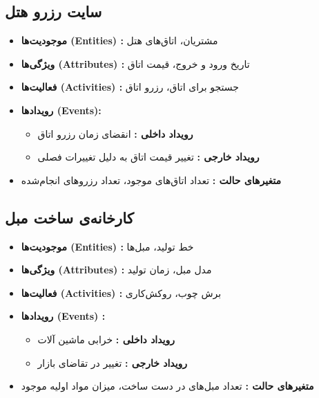 \subsection*{سایت رزرو هتل}
\begin{itemize}
	\item \textbf{موجودیت‌ها (Entities) :} مشتریان، اتاق‌های هتل
	\item \textbf{ویژگی‌ها (Attributes) :} تاریخ ورود و خروج، قیمت اتاق
	\item \textbf{فعالیت‌ها (Activities) :} جستجو برای اتاق، رزرو اتاق
	\item \textbf{رویدادها (Events):}
	\begin{itemize}
		\item \textbf{رویداد داخلی  :} انقضای زمان رزرو اتاق
		\item \textbf{رویداد خارجی  :} تغییر قیمت اتاق به دلیل تغییرات فصلی
	\end{itemize}
	\item \textbf{متغیرهای حالت  :} تعداد اتاق‌های موجود، تعداد رزروهای انجام‌شده
\end{itemize}

\subsection*{کارخانه‌ی ساخت مبل}
\begin{itemize}
	\item \textbf{موجودیت‌ها (Entities) :} خط تولید، مبل‌ها
	\item \textbf{ویژگی‌ها (Attributes) :} مدل مبل، زمان تولید
	\item \textbf{فعالیت‌ها (Activities) :} برش چوب، روکش‌کاری
	\item \textbf{رویدادها (Events) :}
	\begin{itemize}
		\item \textbf{رویداد داخلی  :} خرابی ماشین آلات
		\item \textbf{رویداد خارجی  :} تغییر در تقاضای بازار
	\end{itemize}
	\item \textbf{متغیرهای حالت  :} تعداد مبل‌های در دست ساخت، میزان مواد اولیه موجود
\end{itemize}